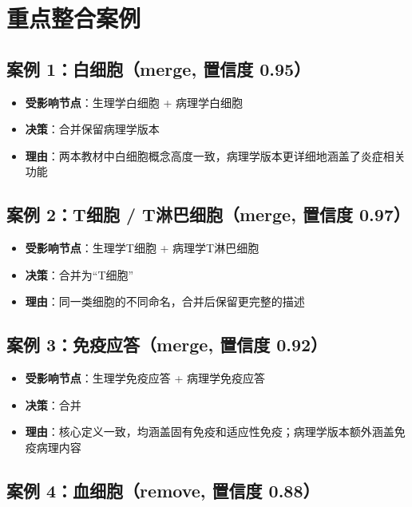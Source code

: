 \documentclass[12pt,a4paper]{article}
\begin{document}
\section{重点整合案例}

\subsection{案例 1：白细胞（merge, 置信度 0.95）}

\begin{itemize}[leftmargin=2em]
    \item \textbf{受影响节点}：生理学\cdot{}白细胞 + 病理学\cdot{}白细胞
    \item \textbf{决策}：合并保留病理学版本
    \item \textbf{理由}：两本教材中白细胞概念高度一致，病理学版本更详细地涵盖了炎症相关功能
\end{itemize}

\subsection{案例 2：T细胞 / T淋巴细胞（merge, 置信度 0.97）}

\begin{itemize}[leftmargin=2em]
    \item \textbf{受影响节点}：生理学\cdot{}T细胞 + 病理学\cdot{}T淋巴细胞
    \item \textbf{决策}：合并为``T细胞''
    \item \textbf{理由}：同一类细胞的不同命名，合并后保留更完整的描述
\end{itemize}

\subsection{案例 3：免疫应答（merge, 置信度 0.92）}

\begin{itemize}[leftmargin=2em]
    \item \textbf{受影响节点}：生理学\cdot{}免疫应答 + 病理学\cdot{}免疫应答
    \item \textbf{决策}：合并
    \item \textbf{理由}：核心定义一致，均涵盖固有免疫和适应性免疫；病理学版本额外涵盖免疫病理内容
\end{itemize}

\subsection{案例 4：血细胞（remove, 置信度 0.88）}
\end{document}
